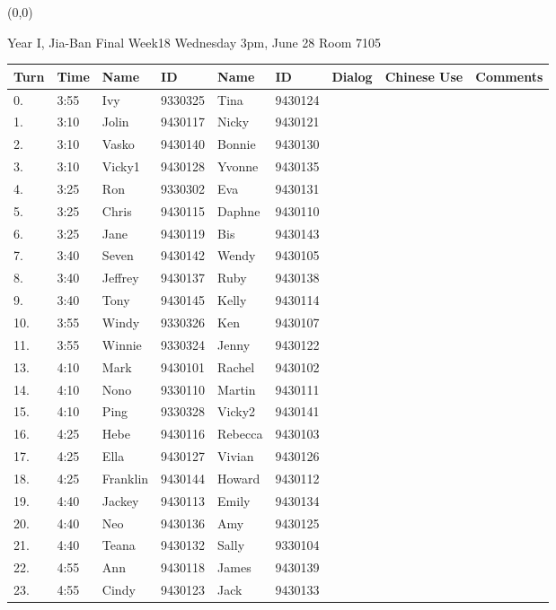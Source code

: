 \documentclass[a4paper]{article}
\begin{document}
\begin{textblock}{15}(0,0)
\begin{minipage}{20cm}
\Large
\begin{Large}Year I, Jia-Ban Final Week18 Wednesday 3pm, June 28 Room 7105\end{Large}
\par
\begin{tabular}[t]{|p{0.5cm}|p{0.8cm}|p{2.1cm}|p{1.6cm}|p{2.1cm}|p{1.6cm}|p{0.9cm}|p{3.0cm}|p{2.5cm}|}
\hline
 Turn & Time & Name & ID & Name & ID & Dialog & Chinese Use & Comments \\ \hline
\hline

0. &3:55& Ivy	&9330325& Tina	&9430124& & & \\ \hline
1. &3:10& Jolin	&9430117& Nicky	&9430121& & & \\ \hline
2. &3:10& Vasko	&9430140& Bonnie	&9430130& & & \\ \hline
3. &3:10& Vicky1	&9430128& Yvonne	&9430135& & & \\ \hline
4. &3:25& Ron	&9330302& Eva	&9430131& & & \\ \hline
5. &3:25& Chris	&9430115& Daphne	&9430110& & & \\ \hline
6. &3:25& Jane	&9430119& Bis	&9430143& & & \\ \hline
7. &3:40& Seven	&9430142& Wendy	&9430105& & & \\ \hline
8. &3:40& Jeffrey	&9430137& Ruby	&9430138& & & \\ \hline
9. &3:40& Tony	&9430145& Kelly	&9430114& & & \\ \hline
10.&3:55& Windy	&9330326& Ken	&9430107& & & \\ \hline
11.&3:55& Winnie	&9330324& Jenny	&9430122& & & \\ \hline
13.&4:10& Mark	&9430101& Rachel	&9430102& & & \\ \hline
14.&4:10& Nono	&9330110& Martin	&9430111& & & \\ \hline
15.&4:10& Ping	&9330328& Vicky2	&9430141& & & \\ \hline
16.&4:25& Hebe	&9430116& Rebecca	&9430103& & & \\ \hline
17.&4:25& Ella	&9430127& Vivian	&9430126& & & \\ \hline
18.&4:25& Franklin	&9430144& Howard	&9430112& & & \\ \hline
19.&4:40& Jackey	&9430113& Emily	&9430134& & & \\ \hline
20.&4:40& Neo	&9430136& Amy	&9430125& & & \\ \hline
21.&4:40& Teana	&9430132& Sally	&9330104& & & \\ \hline
22.&4:55& Ann	&9430118& James	&9430139& & & \\ \hline
23.&4:55& Cindy	&9430123& Jack	&9430133& & & \\ \hline
\hline
\end{tabular}
\end{minipage}
\end{textblock}
\end{document}
